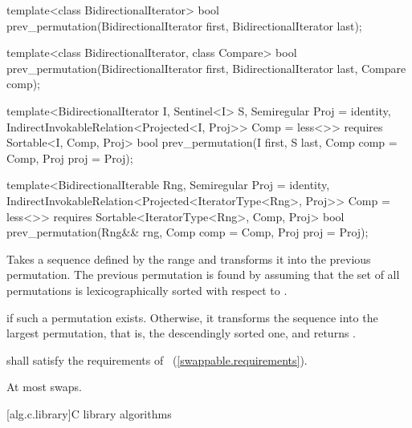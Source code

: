 %
\begin{removedblock}
\begin{itemdecl}
template<class BidirectionalIterator>
  bool prev_permutation(BidirectionalIterator first,
                        BidirectionalIterator last);

template<class BidirectionalIterator, class Compare>
  bool prev_permutation(BidirectionalIterator first,
                        BidirectionalIterator last, Compare comp);
\end{itemdecl}
\end{removedblock}
\begin{addedblock}
\begin{itemdecl}
template<BidirectionalIterator I, Sentinel<I> S, Semiregular Proj = identity,
    IndirectInvokableRelation<Projected<I, Proj>> Comp = less<>>
  requires Sortable<I, Comp, Proj>
  bool prev_permutation(I first, S last, Comp comp = Comp{}, Proj proj = Proj{});

template<BidirectionalIterable Rng, Semiregular Proj = identity,
    IndirectInvokableRelation<Projected<IteratorType<Rng>, Proj>> Comp = less<>>
  requires Sortable<IteratorType<Rng>, Comp, Proj>
  bool
    prev_permutation(Rng&& rng, Comp comp = Comp{}, Proj proj = Proj{});
\end{itemdecl}
\end{addedblock}

\begin{itemdescr}
\pnum
\effects
Takes a sequence defined by the range
and transforms it into the previous permutation.
The previous permutation is found by assuming that the set of all permutations is
lexicographically sorted with respect to
 .

\pnum
\returns
{}
if such a permutation exists.
Otherwise, it transforms the sequence into the largest permutation,
that is, the descendingly sorted one, and returns
.

\begin{removedblock}
\pnum
\requires
{} shall satisfy the requirements of
~(\ref{swappable.requirements}).
\end{removedblock}

\pnum
\complexity
At most
swaps.
\end{itemdescr}

[alg.c.library]{C library algorithms}

